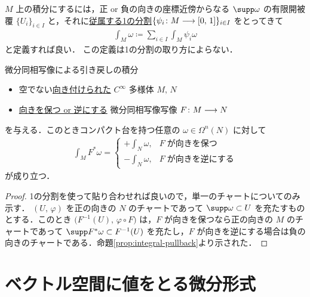 \documentclass[geometry_main]{subfiles}
\begin{document}
$M$ 上の積分にするには，正 or 負の向きの座標近傍からなる $\supp \omega$ の有限開被覆 $\{U_i\}_{i \in I}$ と，それに\hyperref[def:PoU]{従属する1の分割}$\{\psi_i \colon M \longrightarrow [0,\, 1]\}_{i \in I}$ をとってきて
\begin{align}
    \int_M \omega \coloneqq \sum_{i \in I} \int_M \psi_i \omega
\end{align}
と定義すれば良い．
この定義は1の分割の取り方によらない．



\begin{myprop}[label=prop:integral-pullback-general]{微分同相写像による引き戻しの積分}
    \begin{itemize}
        \item 空でない\hyperref[def:smooth-orientation]{向き付けられた} $C^\infty$ 多様体 $M,\, N$
        \item \hyperref[def:orientation-preserving]{向きを保つ or 逆にする} 微分同相写像写像 $F \colon M \longrightarrow N$
    \end{itemize}
    を与える．このときコンパクト台を持つ任意の $\omega \in \Omega^n (N)$ に対して
    \begin{align}
        \int_M F^* \omega = 
        \begin{cases}
            +\int_N \omega, &F\; \text{が向きを保つ} \\
            -\int_N \omega, &F\; \text{が向きを逆にする}
        \end{cases}
    \end{align}
    が成り立つ．
\end{myprop}

\begin{proof}
    1の分割を使って貼り合わせれば良いので，単一のチャートについてのみ示す．
    $(U,\, \varphi)$ を正の向きの $N$ のチャートであって $\supp \omega \subset U$ を充たすものとする．このとき $\bigl( F^{-1}(U),\, \varphi \circ F\bigr)$ は，$F$ が向きを保つなら正の向きの $M$ のチャートであって $\supp F^* \omega \subset F^{-1}(U)$ を充たし，$F$ が向きを逆にする場合は負の向きのチャートである．命題\ref{prop:integral-pullback}より示された．
\end{proof}

\section{ベクトル空間に値をとる微分形式}
\end{document}
